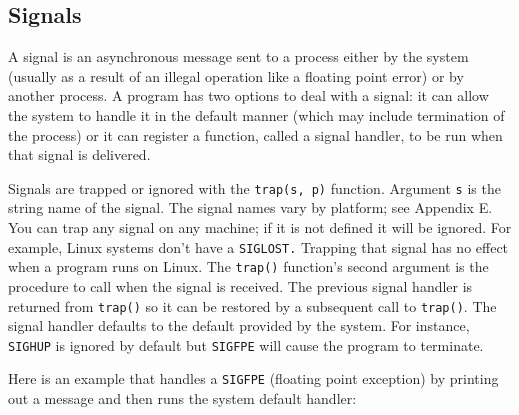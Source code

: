 \subsection*{Signals}

A signal is an asynchronous message sent to a process either by
the system (usually as a result of an illegal operation like a
floating point error) or by another process. A
program has two options to deal with a signal: it can allow the system to handle
it in the default manner (which may include termination of the process) or it
can register a function, called a signal handler, to be run when that signal is
delivered.

Signals are trapped or ignored with the \texttt{trap(s, p)} function.  Argument
\texttt{s} is the string name of the signal. The signal names vary by platform;
see Appendix E. You can trap any signal on any machine; if it is not defined it
will be ignored. For example, Linux systems don't have a \texttt{SIGLOST.}
Trapping that signal has no effect when a program runs on Linux. The
\texttt{trap()} function's second argument is the procedure to call when the
signal is received. The previous signal handler is returned from
\texttt{trap()} so it can be restored by a subsequent call to
\texttt{trap()}. The signal handler defaults to the default provided by the
system. For instance, \texttt{SIGHUP} is ignored by default but \texttt{SIGFPE}
will cause the program to terminate.

Here is an example that handles a \texttt{SIGFPE} (floating point exception) by
printing out a message and then runs the system default handler:


